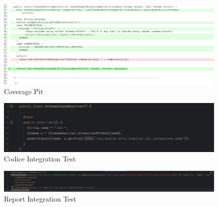 \documentclass[10pt, a4paper]{article}
\begin{document}
  \begin{figure}
    \includegraphics[width=\linewidth]{./images/schema_compatibiity/PitCoverage1.png}
    \caption{Coverage Pit}
    \label{fig:PitMutationSchemaCompatibility1}
  \end{figure}

  \begin{figure}
    \includegraphics[width=\linewidth]{./images/integration_test/IntegrationTest.png}
    \caption{Codice Integration Test}
    \label{fig:CodeIntegrationTest}
  \end{figure}

  \begin{figure}
    \includegraphics[width=\linewidth]{./images/integration_test/FailsafeReport.png}
    \caption{Report Integration Test}
    \label{fig:ReportIntegrationTest}
  \end{figure}

  
\end{document}
